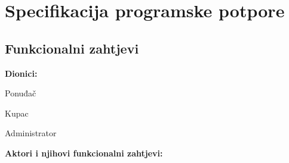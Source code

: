 \chapter{Specifikacija programske potpore}
		
	\section{Funkcionalni zahtjevi}
		
		
		
		\noindent \textbf{Dionici:}
		
		\begin{packed_enum}
			
			\item Ponuđač
			\item Kupac			
			\item Administrator
			
		\end{packed_enum}
		
		\noindent \textbf{Aktori i njihovi funkcionalni zahtjevi:}
		
